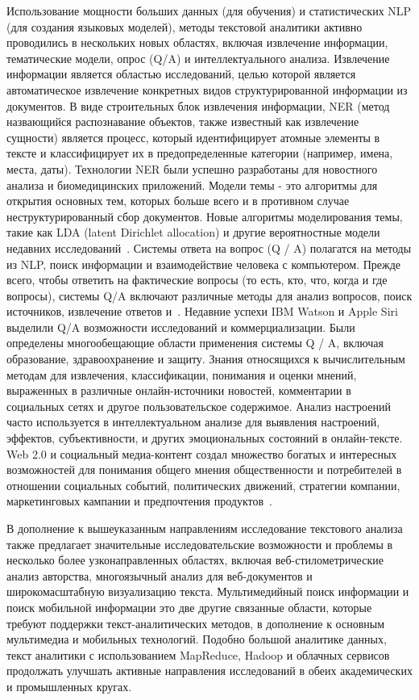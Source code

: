 Использование мощности больших данных (для обучения) и статистических
NLP (для создания языковых моделей), методы текстовой аналитики
активно проводились в нескольких новых областях,
включая извлечение информации, тематические модели, опрос
(Q/A) и интеллектуального анализа. Извлечение информации
является областью исследований, целью которой является автоматическое извлечение
конкретных видов структурированной информации из документов. В виде
строительных блок извлечения информации, NER (метод назвающийся
распознавание объектов, также известный как извлечение сущности) является
процесс, который идентифицирует атомные элементы в тексте и классифицирует
их в предопределенные категории (например, имена, места, даты).
Технологии NER были успешно разработаны для новостного
анализа и биомедицинских приложений. Модели темы - это алгоритмы
для открытия основных тем, которых больше всего
и в противном случае неструктурированный сбор документов. Новые
алгоритмы моделирования темы, такие как LDA (latent Dirichlet
allocation) и другие вероятностные модели
недавних исследований~\cite{Blei:2012}. Системы ответа на вопрос (Q / A)
полагатся на методы из NLP, поиск информации и
взаимодействие человека с компьютером. Прежде всего, чтобы ответить на
фактические вопросы (то есть, кто, что, когда и где
вопросы), системы Q/A включают различные методы для
анализ вопросов, поиск источников, извлечение ответов и~\cite{Maybury:2004}. Недавние успехи
IBM Watson и Apple Siri выделили Q/A
возможности исследований и коммерциализации. Были определены многообещающие области применения системы Q / A,
включая образование, здравоохранение и защиту. Знания
относящихся к вычислительным методам для извлечения, классификации,
понимания и оценки мнений, выраженных в
различные онлайн-источники новостей, комментарии в социальных сетях и
другое пользовательское содержимое. Анализ настроений часто
используется в интеллектуальном анализе для выявления настроений, эффектов, субъективности,
и других эмоциональных состояний в онлайн-тексте. Web 2.0 и
социальный медиа-контент создал множество богатых и интересных
возможностей для понимания общего мнения
общественности и потребителей в отношении социальных событий, политических движений,
стратегии компании, маркетинговых кампании и предпочтения продуктов~\cite{Pang:2008}.

В дополнение к вышеуказанным направлениям исследование текстового анализа также
предлагает значительные исследовательские возможности и проблемы в
несколько более узконаправленных областях, включая веб-стилометрические
анализ авторства, многоязычный анализ для
веб-документов и широкомасштабную визуализацию текста. Мультимедийный
поиск информации и поиск мобильной информации
это две другие связанные области, которые требуют поддержки текст-аналитических методов, в дополнение к основным мультимедиа и
мобильных технологий. Подобно большой аналитике данных, текст
аналитики с использованием MapReduce, Hadoop и облачных сервисов
продолжать улучшать активные направления исследований в обеих академических и промышленных кругах.


